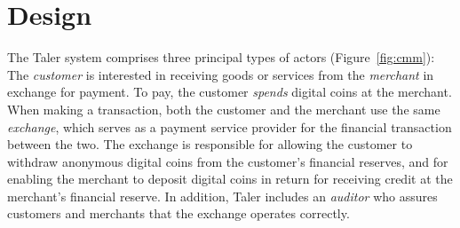 \documentclass[sigconf, authordraft]{acmart}
\begin{document}







\section{Design}

The Taler system comprises three principal types of actors
(Figure~\ref{fig:cmm}): The \emph{customer} is interested in receiving
goods or services from the \emph{merchant} in exchange for payment.
To pay, the customer {\em spends} digital coins at the merchant.  When
making a transaction, both the customer and the merchant use the same
\emph{exchange}, which serves as a payment service provider for the
financial transaction between the two.  The exchange is responsible
for allowing the customer to withdraw anonymous digital coins from the
customer's financial reserves, and for enabling the merchant to
deposit digital coins in return for receiving credit at the merchant's
financial reserve.  In addition, Taler includes an \emph{auditor} who
assures customers and merchants that the exchange operates correctly.
\end{document}

